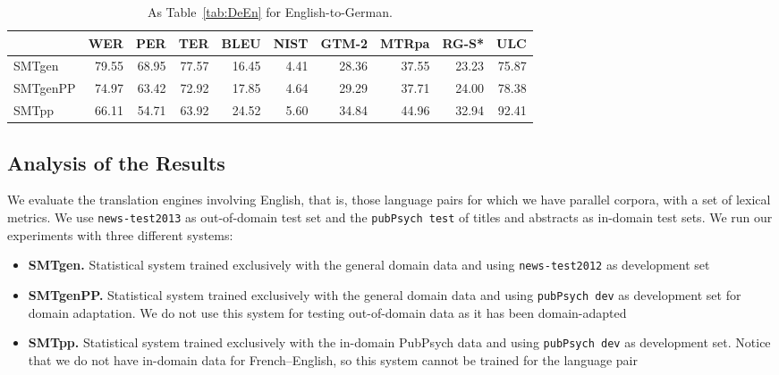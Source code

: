 \documentclass[a4paper,11pt]{article}
\begin{document}
\begin{table}[t]
\begin{tabular}{lrrrrrrrrr}
\toprule
         & WER   &  PER  & TER   &  BLEU & NIST & GTM-2 & MTRpa & RG-S* & ULC \\
\midrule
SMTgen	 & 79.55 & 68.95 & 77.57 & 16.45 & 4.41 & 28.36 & 37.55 & 23.23 & 75.87 \\  
SMTgenPP & 74.97 & 63.42 & 72.92 & 17.85 & 4.64 & 29.29 & 37.71 & 24.00 & 78.38 \\  
SMTpp	 & 66.11 & 54.71 & 63.92 & 24.52 & 5.60 & 34.84 & 44.96 & 32.94 & 92.41 \\  
\bottomrule
\end{tabular}
 \caption{As Table~\ref{tab:DeEn} for English-to-German.}
 \label{tab:EnDe}
\end{table}




\subsection{Analysis of the Results}
\label{ss:smtResults}

We evaluate the translation engines involving English, that is, those language pairs for which we have parallel corpora, with a set of lexical metrics. We use {\tt news-test2013} as out-of-domain test set and the {\tt pubPsych test} of titles and abstracts as in-domain test sets.  We run our experiments with three different systems:
 
\begin{itemize}
 \item {\bf SMTgen.} Statistical system trained exclusively with the general domain data and using {\tt news-test2012} as development set
 \item {\bf SMTgenPP.} Statistical system trained exclusively with the general domain data and using {\tt pubPsych dev} as development set for domain adaptation. We do not use this system for testing out-of-domain data as it has been domain-adapted
 \item {\bf SMTpp.} Statistical system trained exclusively with the in-domain PubPsych data and using {\tt pubPsych dev} as development set. Notice that we do not have in-domain data for French--English, so this system cannot be trained for the language pair
\end{itemize}
\end{document}
